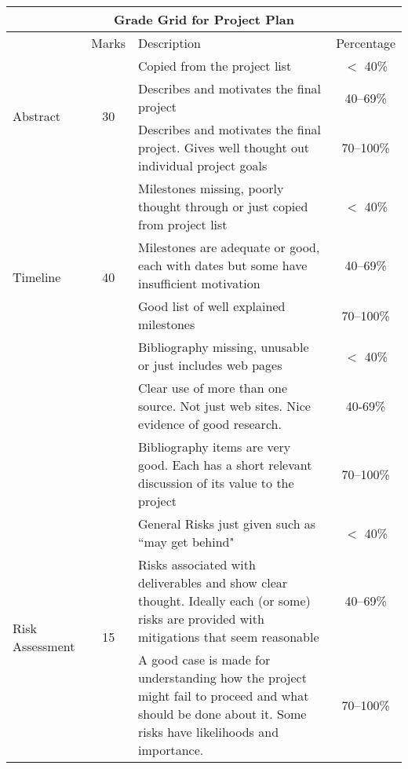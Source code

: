 \documentclass[11pt]{article}
\begin{document}
\noindent
\begin{tabular}{||l|c|p{10cm}|c||}
\hline
\hline
\multicolumn{4}{||c||}{Grade Grid for Project Plan}\\
\hline
\hline
& Marks & Description & Percentage\\
\hline
\hline
\multirow{3}{*}{Abstract}  & \multirow{3}{*}{30} & Copied from the project list & $<$ 40\%\\
\cline{3-4}
&& Describes and motivates the final project & 40--69\% \\
\cline{3-4}
&& Describes and motivates the final project.  Gives well thought out individual project goals & 70--100\% \\
\hline
\hline
\multirow{4}{*}{Timeline} & \multirow{4}{*}{40} & Milestones missing, poorly thought through or just copied from project list & $<$ 40\%\\
\cline{3-4}
&&Milestones are adequate or good, each with dates but some have insufficient motivation & 40--69\%  \\
\cline{3-4}
&&Good list of well explained milestones & 70--100\% \\
\hline
\hline
\multirow{4}{*}{Bibliography} & \multirow{4}{*}{15} & Bibliography missing, unusable or just includes web pages & $<$ 40\% \\
\cline{3-4}
&& Clear use of more than one source.  Not just web sites.  Nice evidence of good research. & 40-69\%  \\
\cline{3-4}
&&Bibliography items are very good.  Each has a short relevant discussion of its value to the project & 70--100\% \\
\hline
\hline
\multirow{4}{*}{Risk Assessment} & \multirow{4}{*}{15} & General Risks just given such as ``may get behind" & $<$ 40\% \\
\cline{3-4}
&& Risks associated with deliverables and show clear thought.  Ideally each (or some) risks are provided with mitigations that seem reasonable & 40--69\%  \\
\cline{3-4}
&&A good case is made for understanding how the project might fail to proceed and what should be done about it.  Some risks have likelihoods and importance. & 70--100\%  \\
\hline
\hline
%

\end{tabular}
\end{document}
